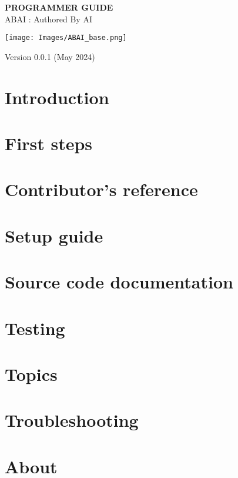 \documentclass[12]{article}
\begin{document}
\begin{Large}
\begin{titlepage}
    \begin{center}
        \vspace*{3cm}
            
        \Huge
        \textbf{\textsc{PROGRAMMER GUIDE}}\\
        \vspace{1cm}
        \huge 
        ABAI : Authored By AI
            
        \vspace{2cm}
        \texttt{[image: Images/ABAI\_base.png]}
        \vfill
    \end{center}
    
    \hfill %
    \begin{minipage}[b]{0.5\textwidth}
        \raggedright 
        \Large 
        Version 0.0.1 (May 2024)
        \vspace*{1cm}
    \end{minipage}
    
\end{titlepage}

\clearpage
\tableofcontents
\clearpage

\section{Introduction}

\clearpage
\section{First steps}

\clearpage
\section{Contributor's reference}

\clearpage
\section{Setup guide}

\clearpage
\section{Source code documentation}

\clearpage
\section{Testing}

\clearpage
\section{Topics}

\section{Troubleshooting}

\clearpage
\section{About}

\end{Large}
\end{document}
